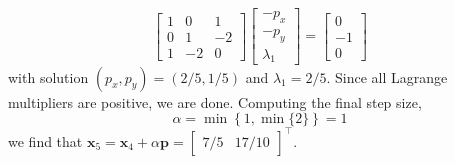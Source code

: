 \documentclass{../kin_math}
\begin{document}
\begin{questions}
\begin{enumerate}
\begin{solution}
      \begin{equation*}
        \begin{bmatrix} 1 & 0 & 1 \\ 0 & 1 & -2 \\ 1 & -2 & 0 \end{bmatrix} \begin{bmatrix} -p_x \\ -p_y \\ \lambda_1 \end{bmatrix} = \begin{bmatrix} 0 \\ -1 \\ 0 \end{bmatrix}
      \end{equation*}
      with solution $(p_x, p_y) = (2 / 5, 1 / 5)$ and $\lambda_1 = 2 / 5$. Since all Lagrange multipliers are positive, we are done. Computing the final step size,
      \begin{equation*}
        \alpha = \min\left\{1, \min\{2\}\right\} = 1
      \end{equation*}
      we find that $\textbf{x}_5 = \textbf{x}_4 + \alpha \textbf{p} = \begin{bmatrix} 7 / 5 & 17 / 10 \end{bmatrix}^\top$.
    \end{solution}
  \end{enumerate}
\end{questions}
\end{document}
